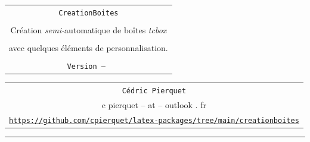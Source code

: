 \documentclass[french,11pt,a4paper]{article}
\begin{document}
\pagestyle{fancy}

\thispagestyle{empty}

\begin{center}
	\begin{minipage}{0.88\linewidth}
	\begin{tcolorbox}[colframe=yellow,colback=yellow!15]
		\begin{center}
			\begin{tabular}{c}
				{\Huge \texttt{CreationBoites}}\\
				\\
				{\LARGE Création \textit{semi-}automatique de boîtes \textit{tcbox}} \\
				\\
				{\LARGE avec quelques éléments de personnalisation.} \\
				\\
				{\small \texttt{Version \cbpackageversion{} -- \cbpackagedate}}
		\end{tabular}
		\end{center}
	\end{tcolorbox}
\end{minipage}
\end{center}

\begin{center}
	\begin{tabular}{c}
	\texttt{Cédric Pierquet}\\
	{\ttfamily c pierquet -- at -- outlook . fr}\\
	\texttt{\url{https://github.com/cpierquet/latex-packages/tree/main/creationboites}}
\end{tabular}
\end{center}

\hrule

\vfill
\end{document}
